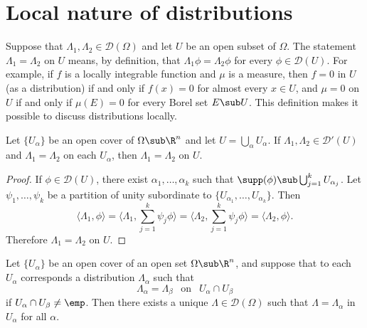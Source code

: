 \section{Local nature of distributions}
Suppose that $\Lambda_1,\Lambda_2\in\mathscr{D}(\Omega)$ and let $U$ be an open subset of $\Omega$. The statement $\Lambda_1=\Lambda_2$ on $U$ means, by definition, that $\Lambda_1\phi=\Lambda_2\phi$ for every $\phi\in\mathscr{D}(U)$. For example, if $f$ is a locally integrable function and $\mu$ is a measure, then $f=0$ in $U$ (as a distribution) if and only if $f(x)=0$ for almost every $x\in U$, and $\mu=0$ on $U$ if and only if $\mu(E)=0$ for every Borel set $E\sub U$. This definition makes it possible to discuss distributions locally.
\begin{proposition}\label{distributin locally determined}
Let $\{U_\alpha\}$ be an open cover of $\Omega\sub\R^n$ and let $U=\bigcup_\alpha U_\alpha$. If $\Lambda_1,\Lambda_2\in\mathscr{D}'(U)$ and $\Lambda_1=\Lambda_2$ on each $U_\alpha$, then $\Lambda_1=\Lambda_2$ on $U$.
\end{proposition}
\begin{proof}
If $\phi\in\mathscr{D}(U)$, there exist $\alpha_1,\dots,\alpha_k$ such that $\supp(\phi)\sub\bigcup_{j=1}^{k}U_{\alpha_j}$. Let $\psi_1,\dots,\psi_k$ be a partition of unity subordinate to $\{U_{\alpha_1},\dots,U_{\alpha_k}\}$. Then
\[\langle\Lambda_1,\phi\rangle=\langle\Lambda_1,\sum_{j=1}^{k}\psi_j\phi\rangle=\langle\Lambda_2,\sum_{j=1}^{k}\psi_j\phi\rangle=\langle\Lambda_2,\phi\rangle.\]
Therefore $\Lambda_1=\Lambda_2$ on $U$.
\end{proof}
\begin{theorem}\label{distributin sheaf prop}
Let $\{U_\alpha\}$ be an open cover of an open set $\Omega\sub\R^n$, and suppose that to each $U_\alpha$ corresponds a distribution $\Lambda_\alpha$ such that
\[\Lambda_\alpha=\Lambda_{\beta}\ \ \text{ on }\ \ U_\alpha\cap U_\beta\]
if $U_\alpha\cap U_\beta\neq\emp$. Then there exists a unique $\Lambda\in\mathscr{D}(\Omega)$ such that $\Lambda=\Lambda_\alpha$ in $U_\alpha$ for all $\alpha$.
\end{theorem}
